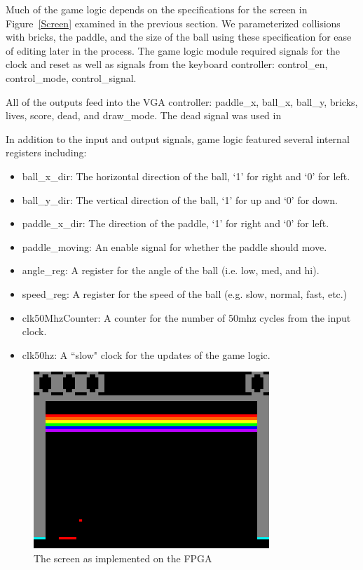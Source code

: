 \documentclass[conference]{IEEEtran}
\begin{document}
Much of the game logic depends on the specifications for the screen in Figure~\ref{Screen} examined in the previous section. We  parameterized collisions with bricks, the paddle, and the size of the ball using these specification for ease of editing later in the process. The game logic module required signals for the clock and reset as well as signals from the keyboard controller: control\_en, control\_mode, control\_signal.

All of the outputs feed into the VGA controller: paddle\_x, ball\_x, ball\_y, bricks, lives, score, dead, and draw\_mode. The dead signal was used in

In addition to the input and output signals, game logic featured several internal registers including:
\begin{itemize}
  \item ball\_x\_dir: The horizontal direction of the ball, `1' for right and `0' for left.
  \item ball\_y\_dir: The vertical direction of the ball, `1' for up and `0' for down.
  \item paddle\_x\_dir: The direction of the paddle, `1' for right and `0' for left.
  \item paddle\_moving: An enable signal for whether the paddle should move.
  \item angle\_reg: A register for the angle of the ball (i.e. low, med, and hi).
  \item speed\_reg: A register for the speed of the ball (e.g. slow, normal, fast, etc.)
  \item clk50MhzCounter: A counter for the number of 50mhz cycles from the input clock.
  \item clk50hz: A ``slow" clock for the updates of the game logic.
\end{itemize}

\begin{figure}[!t]
\centering
\includegraphics[width=3.5in]{ActualScreen}
\caption{The screen as implemented on the FPGA}
\label{ActualScreen}
\end{figure}
\end{document}
